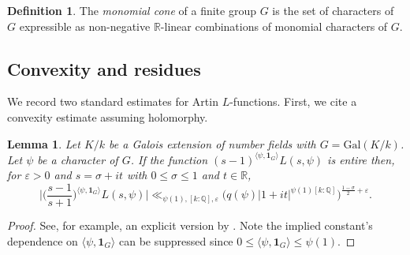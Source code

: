 \documentclass[12pt]{amsart}
\newtheorem{lemma}[theorem]{Lemma}
\theoremstyle{definition} \newtheorem{definition}[theorem]{Definition}
\theoremstyle{example} \newtheorem{example}[theorem]{Example}
\theoremstyle{remark} \newtheorem{remark}{Remark}[theorem]
\numberwithin{equation}{section}
\numberwithin{theorem}{section}
\renewcommand{\epsilon}{\varepsilon}
\renewcommand{\leq}{\leqslant}
\newcommand{\R}{\mathbb{R}}
\newcommand{\Q}{\mathbb{Q}}
\begin{document}
\begin{definition} 
	The \textit{monomial cone} of a finite group $G$ is the set of characters of $G$ expressible as non-negative $\mathbb{R}$-linear combinations of monomial characters of $G$. 
\end{definition}

\subsection{Convexity and residues} We record two standard estimates for Artin $L$-functions. First, we cite a convexity estimate assuming holomorphy.

\begin{lemma} \label{lem:Convexity}
	Let $K/k$ be a Galois extension of number fields with $G = \mathrm{Gal}(K/k)$. Let $\psi$ be a character of $G$. If the function $(s-1)^{\langle \psi, \mathbf{1}_G\rangle} L(s,\psi)$	is entire then, for $\epsilon > 0$ and $s = \sigma+it$ with $0 \leq \sigma \leq 1$ and $t \in \R$, 
	\[
	\Big| \Big(\frac{s-1}{s+1}\Big)^{\langle \psi, \mathbf{1}_G\rangle} L(s,\psi)\Big| \ll_{\psi(1), [k:\Q],\varepsilon}   \big( q(\psi) |1+it|^{\psi(1) [k:\mathbb{Q}]} \big)^{\frac{1-\sigma}{2}+\varepsilon}. 
	\] 
\end{lemma}
\begin{proof}
See, for example, an explicit version by \cite[Lemma 4.1]{LemkeOliver-Smith-FaithfulArtin}. Note the implied constant's dependence on ${\langle \psi, \mathbf{1}_G\rangle} $ can be suppressed since $0 \leq {\langle \psi, \mathbf{1}_G\rangle}  \leq \psi(1)$. 
\end{proof}
\end{document}
